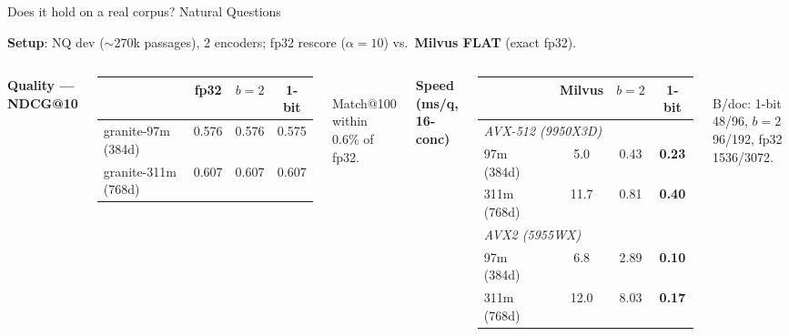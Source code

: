 \documentclass[aspectratio=169,12pt]{beamer}
\begin{document}
\begin{frame}{Does it hold on a real corpus? Natural Questions}

\textbf{Setup}: NQ dev ($\sim$270k passages), 2 encoders; fp32 rescore
($\alpha{=}10$) vs.\ \textbf{Milvus FLAT} (exact fp32).

\vspace{2pt}
\begin{columns}
\centering\small
\textbf{Quality --- NDCG@10}\\[3pt]
\begin{tabular}{l ccc}
\toprule
 & fp32 & $b{=}2$ & 1-bit \\
\midrule
granite-97m \scriptsize(384d)  & 0.576 & 0.576 & 0.575 \\
granite-311m \scriptsize(768d) & 0.607 & 0.607 & 0.607 \\
\bottomrule
\end{tabular}\\[3pt]
{\scriptsize Match@100 within 0.6\% of fp32.}

\centering\scriptsize
\textbf{Speed (ms/q, 16-conc)}\\[3pt]
\begin{tabular}{l ccc}
\toprule
                                          & Milvus  & $b{=}2$ & 1-bit \\
\midrule
\multicolumn{4}{l}{\textit{AVX-512 (9950X3D)}}\\
97m  (384d)                               & 5.0  & 0.43 & \textbf{\textcolor{key}{0.23}} \\
311m (768d)                               & 11.7 & 0.81 & \textbf{\textcolor{key}{0.40}} \\
\midrule
\multicolumn{4}{l}{\textit{AVX2 (5955WX)}}\\
97m  (384d)                               & 6.8  & 2.89 & \textbf{\textcolor{key}{0.10}} \\
311m (768d)                               & 12.0 & 8.03 & \textbf{\textcolor{key}{0.17}} \\
\bottomrule
\end{tabular}\\[3pt]
{B/doc: 1-bit 48/96, $b{=}2$ 96/192, fp32 1536/3072.}
\end{columns}

\vspace{3pt}
\end{frame}
\end{document}
